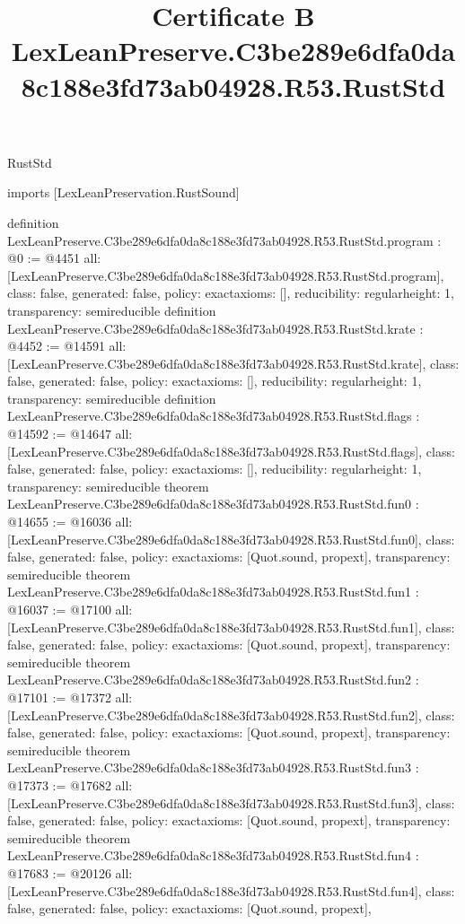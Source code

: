 \begin{lexlean}{RustStd}
\title{Certificate B LexLeanPreserve.C3be289e6dfa0da8c188e3fd73ab04928.R53.RustStd}
\begin{coremodule}
imports [LexLeanPreservation.RustSound]

definition LexLeanPreserve.C3be289e6dfa0da8c188e3fd73ab04928.R53.RustStd.program : @0 := @4451 {
  all: [LexLeanPreserve.C3be289e6dfa0da8c188e3fd73ab04928.R53.RustStd.program],
  class: false,
  generated: false,
  policy: exact{axioms: []},
  reducibility: regular{height: 1},
  transparency: semireducible
}
definition LexLeanPreserve.C3be289e6dfa0da8c188e3fd73ab04928.R53.RustStd.krate : @4452 := @14591 {
  all: [LexLeanPreserve.C3be289e6dfa0da8c188e3fd73ab04928.R53.RustStd.krate],
  class: false,
  generated: false,
  policy: exact{axioms: []},
  reducibility: regular{height: 1},
  transparency: semireducible
}
definition LexLeanPreserve.C3be289e6dfa0da8c188e3fd73ab04928.R53.RustStd.flags : @14592 := @14647 {
  all: [LexLeanPreserve.C3be289e6dfa0da8c188e3fd73ab04928.R53.RustStd.flags],
  class: false,
  generated: false,
  policy: exact{axioms: []},
  reducibility: regular{height: 1},
  transparency: semireducible
}
theorem LexLeanPreserve.C3be289e6dfa0da8c188e3fd73ab04928.R53.RustStd.fun0 : @14655 := @16036 {
  all: [LexLeanPreserve.C3be289e6dfa0da8c188e3fd73ab04928.R53.RustStd.fun0],
  class: false,
  generated: false,
  policy: exact{axioms: [Quot.sound, propext]},
  transparency: semireducible
}
theorem LexLeanPreserve.C3be289e6dfa0da8c188e3fd73ab04928.R53.RustStd.fun1 : @16037 := @17100 {
  all: [LexLeanPreserve.C3be289e6dfa0da8c188e3fd73ab04928.R53.RustStd.fun1],
  class: false,
  generated: false,
  policy: exact{axioms: [Quot.sound, propext]},
  transparency: semireducible
}
theorem LexLeanPreserve.C3be289e6dfa0da8c188e3fd73ab04928.R53.RustStd.fun2 : @17101 := @17372 {
  all: [LexLeanPreserve.C3be289e6dfa0da8c188e3fd73ab04928.R53.RustStd.fun2],
  class: false,
  generated: false,
  policy: exact{axioms: [Quot.sound, propext]},
  transparency: semireducible
}
theorem LexLeanPreserve.C3be289e6dfa0da8c188e3fd73ab04928.R53.RustStd.fun3 : @17373 := @17682 {
  all: [LexLeanPreserve.C3be289e6dfa0da8c188e3fd73ab04928.R53.RustStd.fun3],
  class: false,
  generated: false,
  policy: exact{axioms: [Quot.sound, propext]},
  transparency: semireducible
}
theorem LexLeanPreserve.C3be289e6dfa0da8c188e3fd73ab04928.R53.RustStd.fun4 : @17683 := @20126 {
  all: [LexLeanPreserve.C3be289e6dfa0da8c188e3fd73ab04928.R53.RustStd.fun4],
  class: false,
  generated: false,
  policy: exact{axioms: [Quot.sound, propext]},
}
\end{coremodule}
\end{lexlean}
